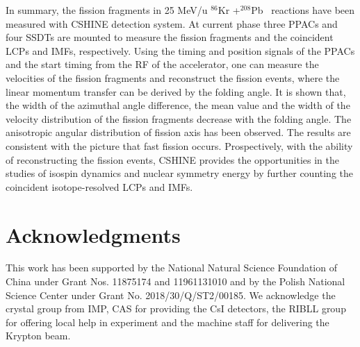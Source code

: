 \documentclass[submitting]{nst}
\def\krpb {$^{86}$Kr +$^{208}$Pb}
\begin{document}
In summary, the fission fragments in  25 MeV/u \krpb~ reactions have been measured with CSHINE detection system.  At current phase  three PPACs and four SSDTs are mounted to measure the fission fragments and the coincident LCPs and IMFs, respectively. Using the timing and position signals of the PPACs and the start timing from the RF of the accelerator, one can measure the velocities of the fission fragments and reconstruct the fission events, where the linear momentum transfer can be derived  by the folding angle. It is shown that, the  width of the azimuthal angle difference, the mean value and the width of the velocity distribution of the fission fragments decrease  with the folding angle. The  anisotropic angular distribution of fission axis has been observed. The results are consistent with the picture that fast fission occurs.  Prospectively, with the ability of  reconstructing the fission events, CSHINE provides the opportunities in the studies of isospin dynamics and nuclear symmetry energy  by further counting  the coincident isotope-resolved LCPs and IMFs.  

\section{Acknowledgments}\label{sec.V}

This work has been supported by the National Natural Science Foundation of China under Grant Nos. 11875174 and 11961131010 and by the Polish National Science Center under Grant No. 2018/30/Q/ST2/00185.  We acknowledge the crystal group from IMP, CAS for providing the CsI detectors, the RIBLL group for offering local help in experiment and the machine staff for delivering the Krypton beam. 
\end{document}
